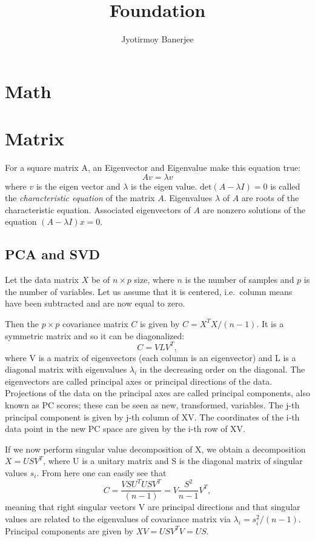 \documentclass{article}
\title{Foundation}
\author{Jyotirmoy Banerjee}
\begin{document}
\maketitle

\section{Math}

\section{Matrix}
For a square matrix A, an Eigenvector and Eigenvalue make this equation true:
\[ Av = \lambda v\]
where $v$ is the eigen vector and $\lambda$ is the eigen value.
$\text{det}(A -  \lambda I) = 0$ is called the \emph{characteristic equation} of the matrix $A$. Eigenvalues $\lambda$ of $A$ are roots of the characteristic equation. Associated eigenvectors of $A$ are nonzero solutions of the equation $(A - \lambda I)x = 0$.

\subsection{PCA and SVD}

Let the data matrix $X$ be of $n \times p$ size, where $n$ is the number of samples and $p$ is the number of variables. Let us assume that it is centered, i.e.\ column means have been subtracted and are now equal to zero.

Then the $p \times p$ covariance matrix $C$ is given by $C= X^TX/(n-1)$. It is a symmetric matrix and so it can be diagonalized:
\[C = VLV^T ,\]
where V is a matrix of eigenvectors (each column is an eigenvector) and L is a diagonal matrix with eigenvalues $\lambda_i$ in the decreasing order on the diagonal. The eigenvectors are called principal axes or principal directions of the data. Projections of the data on the principal axes are called principal components, also known as PC scores; these can be seen as new, transformed, variables. The j-th principal component is given by j-th column of XV. The coordinates of the i-th data point in the new PC space are given by the i-th row of XV.

If we now perform singular value decomposition of X, we obtain a decomposition
$X=USV^T$,
where U is a unitary matrix and S is the diagonal matrix of singular values $s_i$. From here one can easily see that
\[ C=\frac{VSU^TUSV^T}{(n-1)} = V\frac{S^2}{n-1}V^T, \]
meaning that right singular vectors V are principal directions and that singular values are related to the eigenvalues of covariance matrix via $\lambda_i = s^2_i/(n-1)$. Principal components are given by $XV=USV^TV=US$.
\end{document}
